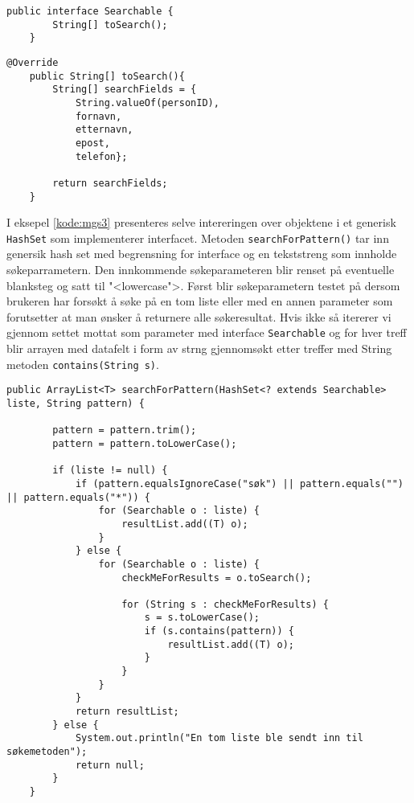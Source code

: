 \begin{lstlisting}[caption=Oversikt over \texttt{Searchable} interface, label=kode:mgs1]
	public interface Searchable {
   		String[] toSearch();
	}
\end{lstlisting}

\begin{lstlisting}[caption=Implemntasjon av metode \texttt{toSearch() i klassen Person.java}, label=kode:mgs2]
	@Override
    public String[] toSearch(){
        String[] searchFields = {
            String.valueOf(personID), 
            fornavn, 
            etternavn, 
            epost, 
            telefon};
        
        return searchFields;
    }
\end{lstlisting}

I eksepel \ref{kode:mgs3} presenteres selve intereringen over objektene i et generisk \texttt{HashSet} som implementerer interfacet. Metoden \texttt{searchForPattern()} tar inn genersik hash set med begrensning for interface og en tekststreng som innholde søkeparrametern. Den innkommende søkeparameteren blir renset på eventuelle blanksteg og satt til "<lowercase">. Først blir søkeparametern testet på dersom brukeren har forsøkt å søke på en tom liste eller med en annen parameter som forutsetter at man ønsker å returnere alle søkeresultat. Hvis ikke så itererer vi gjennom settet mottat som parameter med interface \texttt{Searchable} og for hver treff blir arrayen med datafelt i form av strng gjennomsøkt etter treffer med String metoden \texttt{contains(String s)}. 

\begin{lstlisting}[caption=Iterasjon over generisk \texttt{HashSet} som implementerer interface \texttt{Searchable}, label=kode:mgs3]
    public ArrayList<T> searchForPattern(HashSet<? extends Searchable> liste, String pattern) {

        pattern = pattern.trim();
        pattern = pattern.toLowerCase();

        if (liste != null) {
            if (pattern.equalsIgnoreCase("søk") || pattern.equals("") || pattern.equals("*")) {
                for (Searchable o : liste) {
                    resultList.add((T) o);
                }
            } else {
                for (Searchable o : liste) {
                    checkMeForResults = o.toSearch();

                    for (String s : checkMeForResults) {
                        s = s.toLowerCase();
                        if (s.contains(pattern)) {
                            resultList.add((T) o);
                        }
                    }
                }
            }
            return resultList;
        } else {
            System.out.println("En tom liste ble sendt inn til søkemetoden");
            return null;
        }
    }
\end{lstlisting}

